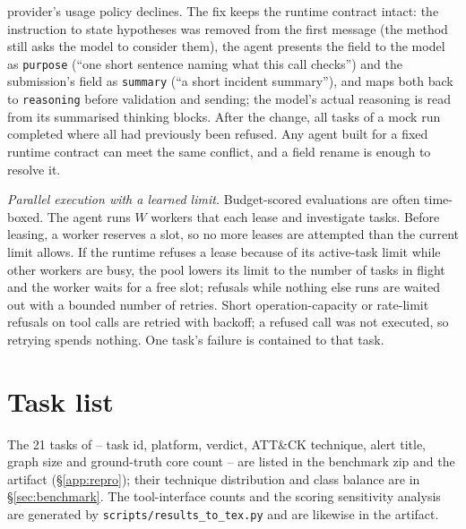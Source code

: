 provider's usage policy declines. The fix keeps the runtime contract intact: the instruction to state
hypotheses was removed from the first message (the method still asks the model to consider them), the agent
presents the field to the model as \texttt{purpose} (``one short sentence naming what this call checks'') and
the submission's field as \texttt{summary} (``a short incident summary''), and maps both back to
\texttt{reasoning} before validation and sending; the model's actual reasoning is read from its summarised
thinking blocks. After the change, all tasks of a mock run completed where all had previously been refused. Any
agent built for a fixed runtime contract can meet the same conflict, and a field rename is enough to resolve it.

\emph{Parallel execution with a learned limit.} Budget-scored evaluations are often time-boxed. The agent runs
$W$ workers that each lease and investigate tasks. Before leasing, a worker reserves a slot, so no more leases
are attempted than the current limit allows. If the runtime refuses a lease because of its active-task limit
while other workers are busy, the pool lowers its limit to the number of tasks in flight and the worker waits
for a free slot; refusals while nothing else runs are waited out with a bounded number of retries. Short
operation-capacity or rate-limit refusals on tool calls are retried with backoff; a refused call was not
executed, so retrying spends nothing. One task's failure is contained to that task.
\fi

\ifconf


\section{Task list}
\label{app:tables}
The 21 tasks of \bench -- task id, platform, verdict, ATT\&CK technique, alert title, graph size and
ground-truth core count -- are listed in the benchmark zip and the artifact (\S\ref{app:repro}); their technique
distribution and class balance are in \S\ref{sec:benchmark}. The tool-interface counts and the scoring
sensitivity analysis are generated by \texttt{scripts/results\_to\_tex.py} and are likewise in the artifact.
\fi
